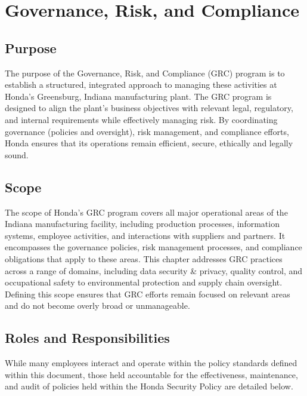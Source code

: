 \chapter{Governance, Risk, and Compliance}
\pagestyle{fancy}

\fancyhf{}

\fancyfoot[C]{\thepage}

\renewcommand{\headrulewidth}{0pt}
\renewcommand{\footrulewidth}{0pt}



\section{Purpose}
The purpose of the Governance, Risk, and Compliance (GRC) program is to establish a structured, integrated approach to managing these activities at Honda's Greensburg, Indiana manufacturing plant. The GRC program is designed to align the plant’s business objectives with relevant legal, regulatory, and internal requirements while effectively managing risk. By coordinating governance (policies and oversight), risk management, and compliance efforts, Honda ensures that its operations remain efficient, secure, ethically and legally sound.

\section{Scope}
The scope of Honda's GRC program covers all major operational areas of the Indiana manufacturing facility, including production processes, information systems, employee activities, and interactions with suppliers and partners. It encompasses the governance policies, risk management processes, and compliance obligations that apply to these areas. This chapter addresses GRC practices across a range of domains, including data security \& privacy, quality control, and occupational safety to environmental protection and supply chain oversight. Defining this scope ensures that GRC efforts remain focused on relevant areas and do not become overly broad or unmanageable.

\section{Roles and Responsibilities}

While many employees interact and operate within the policy standards defined within this document, those held accountable for the effectiveness, maintenance, and audit of policies held within the Honda Security Policy are detailed below.

